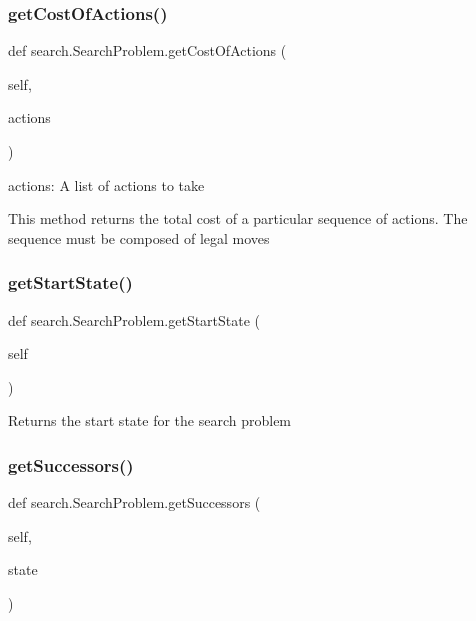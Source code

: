 \subsubsection{\texorpdfstring{get\+Cost\+Of\+Actions()}{getCostOfActions()}}
{\footnotesize\ttfamily def search.\+Search\+Problem.\+get\+Cost\+Of\+Actions (\begin{DoxyParamCaption}\item[{}]{self,  }\item[{}]{actions }\end{DoxyParamCaption})}

\begin{DoxyVerb} actions: A list of actions to take

This method returns the total cost of a particular sequence of actions.  The sequence must
be composed of legal moves
\end{DoxyVerb}
 \mbox{\label{classsearch_1_1_search_problem_a4ffd125695767220d899c77f058e7577}} 
\subsubsection{\texorpdfstring{get\+Start\+State()}{getStartState()}}
{\footnotesize\ttfamily def search.\+Search\+Problem.\+get\+Start\+State (\begin{DoxyParamCaption}\item[{}]{self }\end{DoxyParamCaption})}

\begin{DoxyVerb}Returns the start state for the search problem
\end{DoxyVerb}
 \mbox{\label{classsearch_1_1_search_problem_a2e97eaf1f2b9fcb129711a862a4ebd63}} 
\subsubsection{\texorpdfstring{get\+Successors()}{getSuccessors()}}
{\footnotesize\ttfamily def search.\+Search\+Problem.\+get\+Successors (\begin{DoxyParamCaption}\item[{}]{self,  }\item[{}]{state }\end{DoxyParamCaption})}


